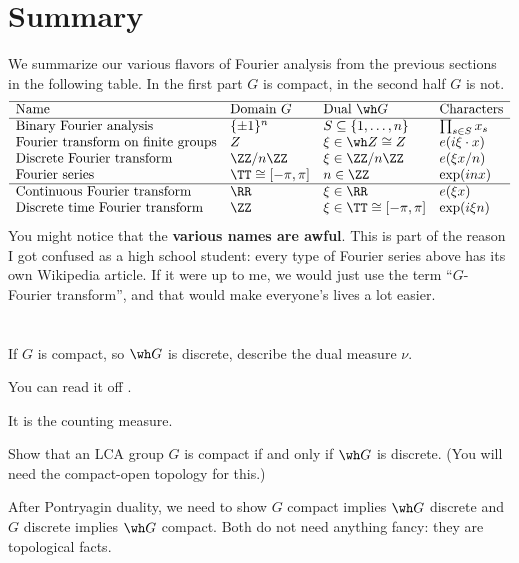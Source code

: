 \section{Summary}
We summarize our various flavors of Fourier analysis
from the previous sections in the following table.
In the first part $G$ is compact,
in the second half $G$ is not.
\[
	\begin{array}{llll}
		\hline
		\text{Name} & \text{Domain }G & \text{Dual }\wh G
			& \text{Characters} \\ \hline
		\text{Binary Fourier analysis} & \{\pm1\}^n
			& S \subseteq \left\{ 1, \dots, n \right\}
			& \prod_{s \in S} x_s \\
		\text{Fourier transform on finite groups} & Z
			& \xi \in \wh Z \cong Z & e( i \xi \cdot x) \\
		\text{Discrete Fourier transform} & \ZZ/n\ZZ & \xi \in \ZZ/n\ZZ
			& e(\xi x / n) \\
		\text{Fourier series} & \TT \cong [-\pi, \pi]  & n \in \ZZ
			& \exp(inx) \\ \hline
		\text{Continuous Fourier transform} & \RR & \xi \in \RR
		 	& e(\xi x) \\
		\text{Discrete time Fourier transform} & \ZZ & \xi \in \TT \cong [-\pi, \pi]
		 	& \exp(i \xi n) \\
	\end{array}
\]
You might notice that the \textbf{various names are awful}.
This is part of the reason I got confused as a high school student:
every type of Fourier series above has its own Wikipedia article.
If it were up to me, we would just use the term ``$G$-Fourier transform'',
and that would make everyone's lives a lot easier.



\section{\problemhead}
\begin{problem}
	If $G$ is compact, so $\wh G$ is discrete,
	describe the dual measure $\nu$.
	\begin{hint}
		You can read it off .
	\end{hint}
	\begin{sol}
		It is the counting measure.
	\end{sol}
\end{problem}

\begin{problem}
	\label{prob:LCA_compact}
	Show that an LCA group $G$ is compact
	if and only if $\wh G$ is discrete.
	(You will need the compact-open topology for this.)
	\begin{hint}
		After Pontryagin duality,
		we need to show $G$ compact implies $\wh G$ discrete
		and $G$ discrete implies $\wh G$ compact.
		Both do not need anything fancy:
		they are topological facts.
	\end{hint}
\end{problem}

